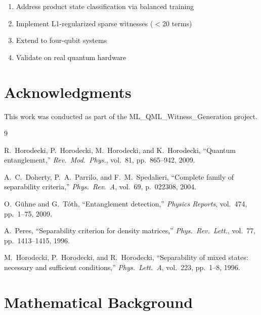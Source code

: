 \documentclass[11pt,a4paper]{article}
\begin{document}
\begin{enumerate}[noitemsep]
    \item Address product state classification via balanced training
    \item Implement L1-regularized sparse witnesses ($<$20 terms)
    \item Extend to four-qubit systems
    \item Validate on real quantum hardware
\end{enumerate}

\section*{Acknowledgments}

This work was conducted as part of the ML\_QML\_Witness\_Generation project.

\begin{thebibliography}{9}

R.~Horodecki, P.~Horodecki, M.~Horodecki, and K.~Horodecki,
``Quantum entanglement,''
\textit{Rev.\ Mod.\ Phys.}, vol.~81, pp.~865--942, 2009.

A.~C.~Doherty, P.~A.~Parrilo, and F.~M.~Spedalieri,
``Complete family of separability criteria,''
\textit{Phys.\ Rev.\ A}, vol.~69, p.~022308, 2004.

O.~G\"uhne and G.~T\'oth,
``Entanglement detection,''
\textit{Physics Reports}, vol.~474, pp.~1--75, 2009.

A.~Peres,
``Separability criterion for density matrices,''
\textit{Phys.\ Rev.\ Lett.}, vol.~77, pp.~1413--1415, 1996.

M.~Horodecki, P.~Horodecki, and R.~Horodecki,
``Separability of mixed states: necessary and sufficient conditions,''
\textit{Phys.\ Lett.\ A}, vol.~223, pp.~1--8, 1996.

\end{thebibliography}

\appendix
\section{Mathematical Background}
\end{document}
